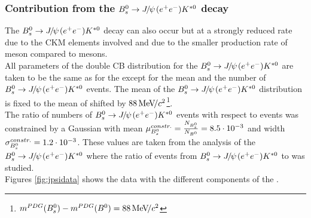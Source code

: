 \subsubsection{Contribution from the $\Bs \rightarrow \jpsi (\epem)  \Kstarz$ decay}
The  $\Bs \rightarrow \jpsi (\epem)  \Kstarz$ decay can also occur but at a strongly reduced rate due to the CKM elements involved and due to the smaller production rate of \Bs meson compared to \Bd mesons.\\
All parameters of the double CB distribution for the $\Bs \rightarrow \jpsi (\epem)  \Kstarz$ are taken to be the same as for the \BdToJPsieeKst except for the mean and the number of $\Bs \rightarrow \jpsi (\epem)  \Kstarz$ events. The mean of the $\Bs \rightarrow \jpsi (\epem)  \Kstarz$ distribution is fixed to the mean of \BdToJPsieeKst shifted by $88 {\mathrm{\,Me\kern -0.1em V\!/}c^2}$\footnote{$m^{PDG}(B^0_s) - m^{PDG}(B^0) = 88{\mathrm{\,Me\kern -0.1em V\!/}c^2}$}.\\
The ratio of numbers of $\Bs \rightarrow \jpsi (\epem) \Kstarz$ events with respect to \BdToJPsieeKst events was constrained by a Gaussian with mean
 $\mu^{constr.}_{B^0_s} = \frac{N_{B^0_s}}{N_{B^0}} = 8.5 \cdot 10^{-3}$ and width $\sigma^{constr.}_{B^0_s} = 1.2 \cdot 10^{-3}$.
These values are taken from the analysis of the\\ $\Bs \rightarrow \jpsi (\epem) \Kstarz$ \cite{BsJpsi} where the ratio of events from $\Bs \rightarrow \jpsi (\epem) \Kstarz$ to \BdToJPsieeKst was studied.\\
Figures \ref{fig:jpsidata} shows the \BdToJPsieeKst \lhcb data with the different components of the \PDF.

